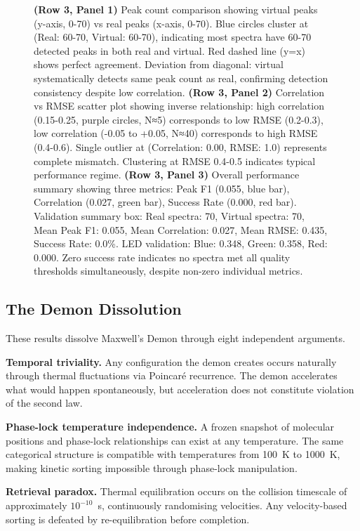 \begin{figure}[htbp]
{    \textbf{(Row 3, Panel 1)} Peak count comparison showing virtual peaks (y-axis, 0-70) vs real peaks (x-axis, 0-70). Blue circles cluster at (Real: 60-70, Virtual: 60-70), indicating most spectra have 60-70 detected peaks in both real and virtual. Red dashed line (y=x) shows perfect agreement. Deviation from diagonal: virtual systematically detects same peak count as real, confirming detection consistency despite low correlation. 
    \textbf{(Row 3, Panel 2)} Correlation vs RMSE scatter plot showing inverse relationship: high correlation (0.15-0.25, purple circles, N≈5) corresponds to low RMSE (0.2-0.3), low correlation (-0.05 to +0.05, N≈40) corresponds to high RMSE (0.4-0.6). Single outlier at (Correlation: 0.00, RMSE: 1.0) represents complete mismatch. Clustering at RMSE 0.4-0.5 indicates typical performance regime. 
    \textbf{(Row 3, Panel 3)} Overall performance summary showing three metrics: Peak F1 (0.055, blue bar), Correlation (0.027, green bar), Success Rate (0.000, red bar). Validation summary box: Real spectra: 70, Virtual spectra: 70, Mean Peak F1: 0.055, Mean Correlation: 0.027, Mean RMSE: 0.435, Success Rate: 0.0\%. LED validation: Blue: 0.348, Green: 0.358, Red: 0.000. Zero success rate indicates no spectra met all quality thresholds simultaneously, despite non-zero individual metrics.}
    \label{fig:validation_comprehensive}
\end{figure}


\subsection{The Demon Dissolution}

These results dissolve Maxwell's Demon through eight independent arguments.

\textbf{Temporal triviality.} Any configuration the demon creates occurs naturally through thermal fluctuations via Poincaré recurrence. The demon accelerates what would happen spontaneously, but acceleration does not constitute violation of the second law.

\textbf{Phase-lock temperature independence.} A frozen snapshot of molecular positions and phase-lock relationships can exist at any temperature. The same categorical structure is compatible with temperatures from 100~K to 1000~K, making kinetic sorting impossible through phase-lock manipulation.

\textbf{Retrieval paradox.} Thermal equilibration occurs on the collision timescale of approximately $10^{-10}$~s, continuously randomising velocities. Any velocity-based sorting is defeated by re-equilibration before completion.

